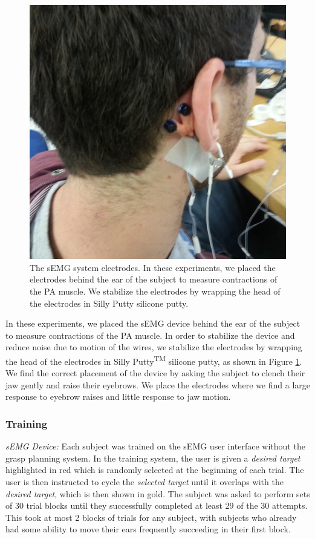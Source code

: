 \begin{figure}
\centering
\includegraphics[width=.95\columnwidth,trim={30cm 40cm 20cm 20cm},clip=true]{user_semg_2.jpg}
\caption{The sEMG system electrodes. In these experiments, we placed the electrodes behind the ear of the subject to measure contractions of the PA muscle. We stabilize the electrodes by wrapping the head of the electrodes in Silly Putty silicone putty.}
\label{fig:silly-putty}
\end{figure}

In these experiments, we placed the sEMG device behind the ear of the subject to measure contractions of the PA muscle. In order to stabilize the device and reduce noise due to motion of the wires, we stabilize the electrodes by wrapping the head of the electrodes in Silly Putty\textsuperscript{TM} silicone putty, as shown in Figure \ref{fig:silly-putty}. We find the correct placement of the device by asking the subject to clench their jaw gently and raise their eyebrows. We place the electrodes where we find a large response to eyebrow raises and  little response to jaw motion.

\subsubsection{Training}
\emph{sEMG Device:} Each subject was trained on the sEMG user interface without the grasp planning system. In the training system, the user is given a \emph{desired target} highlighted in red which is randomly selected at the beginning of each trial. The user is then instructed to cycle the \emph{selected target} until it overlaps with the \emph{desired target}, which is then shown in gold. The subject was asked to perform sets of 30 trial blocks until they successfully completed at least 29 of the 30 attempts. This took at most 2 blocks of trials for any subject, with subjects who already had some ability to move their ears frequently succeeding in their first block. 

